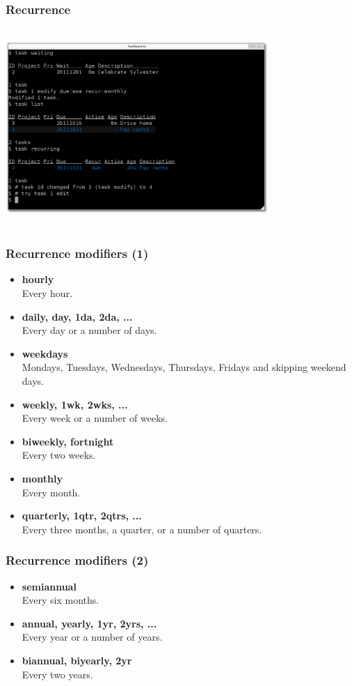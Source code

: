\documentclass[t,handout]{beamer}
\begin{document}
\begin{frame}
\frametitle{Recurrence}
\begin{center}
\includegraphics[width=10cm,height=7.5cm]{recur.png}
\end{center}
\end{frame}

\begin{frame}
\frametitle{Recurrence modifiers (1)}
\begin{itemize}
\item \textbf{hourly} \\
Every hour.
\item \textbf{daily, day, 1da, 2da, ...} \\
Every day or a number of days.
\item \textbf{weekdays} \\
Mondays, Tuesdays, Wednesdays, Thursdays, Fridays and skipping  weekend days.
\item \textbf{weekly, 1wk, 2wks, ...} \\
Every week or a number of weeks.
\item \textbf{biweekly, fortnight} \\
Every two weeks.
\item \textbf{monthly} \\
Every month.
\item \textbf{quarterly, 1qtr, 2qtrs, ...} \\
Every three months, a quarter, or a number of quarters.
\end{itemize}
\end{frame}

\begin{frame}
\frametitle{Recurrence modifiers (2)}
\begin{itemize}
\item \textbf{semiannual} \\
Every six months.
\item \textbf{annual, yearly, 1yr, 2yrs, ...} \\
Every year or a number of years.
\item \textbf{biannual, biyearly, 2yr} \\
Every two years.
\end{itemize}
\end{frame}
\end{document}
